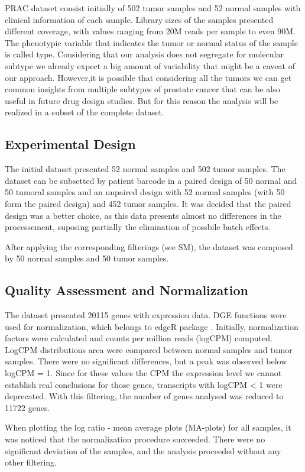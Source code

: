 \documentclass[9pt,twocolumn,twoside]{gsajnl}
\begin{document}
PRAC dataset consist initially of 502 tumor samples and 52 normal samples with clinical information of each sample. Library sizes of the samples presented different coverage, with values ranging from 20M reads per sample to even 90M.  The phenotypic variable that indicates the tumor or normal status of the sample is called type.  Considering that our analysis does not segregate for molecular subtype we already expect a big amount of variability that might be a caveat of our approach. However,it is possible that considering all the tumors we can get common insights from multiple subtypes of prostate cancer that can be also useful in future drug design studies. But for this reason the analysis will be realized in a subset of the complete dataset. 
\subsection*{Experimental Design}

The initial dataset presented 52 normal samples and 502 tumor samples. The dataset can be subsetted by patient barcode in a paired design of 50 normal and 50 tumoral samples and an unpaired design with 52 normal samples (with 50 form the paired design) and 452 tumor samples. It was decided that the paired design was a better choice, as this data presents almost no differences in the processement, suposing partially the elimination of possbile batch effects.

After applying the corresponding filterings (see SM), the dataset was composed by 50 normal samples and 50 tumor samples.

\subsection*{Quality Assessment and Normalization}

The dataset presented 20115 genes with expression data.  DGE functions were used for normalization, which belongs to edgeR package \citep{Robinson01012010}. Initially, normalization factors were calculated and counts per million reads (logCPM) computed. LogCPM distributions area were compared between normal samples and tumor samples. There were no significant differences, but a peak was observed below logCPM = 1. Since for these values the CPM the expression level we cannot establish real conclusions for those genes, transcripts with logCPM < 1 were deprecated. With this filtering, the number of genes analysed was reduced to 11722 genes. 

When plotting the log ratio - mean average plots (MA-plots) for all samples, it was noticed that the normalization procedure succeeded. There were no significant deviation of the samples, and the analysis proceeded without any other filtering.
\end{document}
